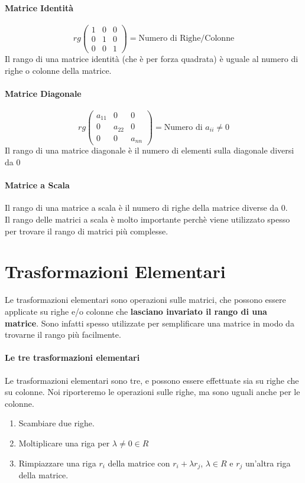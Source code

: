\paragraph{Matrice Identità}
\[ rg
	\begin{pmatrix}
		1 & 0 & 0 \\
		0 & 1 & 0 \\
		0 & 0 & 1
	\end{pmatrix}
	= \text{Numero di Righe/Colonne}
\]
Il rango di una matrice identità (che è per forza quadrata) è uguale al numero di righe o colonne della matrice.

\paragraph{Matrice Diagonale}
\[ rg
	\begin{pmatrix}
		a_{11} & 0      & 0      \\
		0      & a_{22} & 0      \\
		0      & 0      & a_{nn}
	\end{pmatrix}
	= \text{Numero di } a_{ii}\neq 0
\]
Il rango di una matrice diagonale è il numero di elementi sulla diagonale diversi da 0

\paragraph{Matrice a Scala}
Il rango di una matrice a scala è il numero di righe della matrice diverse da 0.
\\Il rango delle matrici a scala è molto importante perchè viene utilizzato spesso per trovare il rango di matrici più complesse.

\section{Trasformazioni Elementari}
Le trasformazioni elementari sono operazioni sulle matrici, che possono essere applicate su righe e/o colonne che \textbf{lasciano invariato il rango di una matrice}.
Sono infatti spesso utilizzate per semplificare una matrice in modo da trovarne il rango più facilmente.

\paragraph{Le tre trasformazioni elementari}
Le trasformazioni elementari sono tre, e possono essere effettuate sia su righe che su colonne. Noi riporteremo le operazioni sulle righe, ma sono uguali anche per le colonne.
\begin{enumerate}
	\item Scambiare due righe.
	\item Moltiplicare una riga per $\lambda \neq 0  \in R$
	\item Rimpiazzare una riga $r_i$ della matrice con $r_i + \lambda r_j$, $\lambda \in R$ e $r_j$ un'altra riga della matrice.
\end{enumerate}

